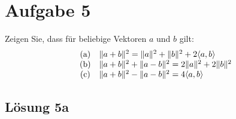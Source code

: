 \section{Aufgabe 5}

Zeigen Sie, dass für beliebige Vektoren $\displaystyle a$ und $\displaystyle b$ gilt:
\begin{equation*}
  \begin{array}{ c l }
    \text{(a)} & \| a+b\| ^{2} =\| a\| ^{2} +\| b\| ^{2} +2\langle a,b\rangle \\
    \text{(b)} & \| a+b\| ^{2} +\| a-b\| ^{2} =2\| a\| ^{2} +2\| b\| ^{2}\\
    \text{(c)} & \| a+b\| ^{2} -\| a-b\| ^{2} =4\langle a,b\rangle 
  \end{array}
\end{equation*}


\subsection{Lösung 5a}

